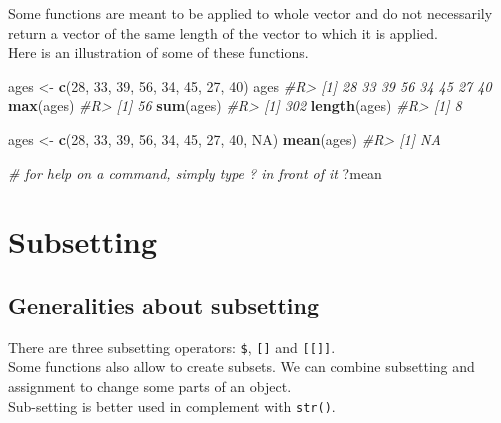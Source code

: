 \documentclass[]{book}
\newenvironment{Shaded}{}{}
\newcommand{\CommentTok}[1]{\textcolor[rgb]{0.38,0.63,0.69}{\textit{#1}}}
\newcommand{\DecValTok}[1]{\textcolor[rgb]{0.25,0.63,0.44}{#1}}
\newcommand{\KeywordTok}[1]{\textcolor[rgb]{0.00,0.44,0.13}{\textbf{#1}}}
\newcommand{\NormalTok}[1]{#1}
\newcommand{\OtherTok}[1]{\textcolor[rgb]{0.00,0.44,0.13}{#1}}
\newcommand{\StringTok}[1]{\textcolor[rgb]{0.25,0.44,0.63}{#1}}
\theoremstyle{definition}
\theoremstyle{definition}
\theoremstyle{definition}
\theoremstyle{remark}
\begin{document}
Some functions are meant to be applied to whole vector and do not
necessarily return a vector of the same length of the vector to which it
is applied.\\
Here is an illustration of some of these functions.

\begin{Shaded}
\begin{Highlighting}[]
\NormalTok{ages <-}\StringTok{ }\KeywordTok{c}\NormalTok{(}\DecValTok{28}\NormalTok{, }\DecValTok{33}\NormalTok{, }\DecValTok{39}\NormalTok{, }\DecValTok{56}\NormalTok{, }\DecValTok{34}\NormalTok{, }\DecValTok{45}\NormalTok{, }\DecValTok{27}\NormalTok{, }\DecValTok{40}\NormalTok{)}
\NormalTok{ages}
\CommentTok{#R> [1] 28 33 39 56 34 45 27 40}
\KeywordTok{max}\NormalTok{(ages)}
\CommentTok{#R> [1] 56}
\KeywordTok{sum}\NormalTok{(ages)}
\CommentTok{#R> [1] 302}
\KeywordTok{length}\NormalTok{(ages)}
\CommentTok{#R> [1] 8}

\NormalTok{ages <-}\StringTok{ }\KeywordTok{c}\NormalTok{(}\DecValTok{28}\NormalTok{, }\DecValTok{33}\NormalTok{, }\DecValTok{39}\NormalTok{, }\DecValTok{56}\NormalTok{, }\DecValTok{34}\NormalTok{, }\DecValTok{45}\NormalTok{, }\DecValTok{27}\NormalTok{, }\DecValTok{40}\NormalTok{, }\OtherTok{NA}\NormalTok{)}
\KeywordTok{mean}\NormalTok{(ages)}
\CommentTok{#R> [1] NA}

\CommentTok{# for help on a command, simply type ? in front of it}
\NormalTok{?mean}
\end{Highlighting}
\end{Shaded}

\hypertarget{subset}{%
\chapter{Subsetting}\label{subset}}

\hypertarget{generalities-about-subsetting}{%
\section{Generalities about
subsetting}\label{generalities-about-subsetting}}

There are three subsetting operators: \texttt{\$}, \texttt{{[}{]}} and
\texttt{{[}{[}{]}{]}}.\\
Some functions also allow to create subsets. We can combine subsetting
and assignment to change some parts of an object.\\
Sub-setting is better used in complement with \texttt{str()}.
\end{document}
